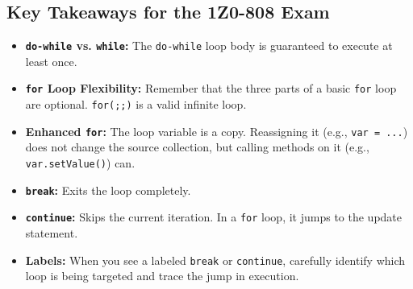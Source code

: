\documentclass[12pt]{article}
\begin{document}
\begin{enumerate}[label=(\arabic*)]
\section*{Key Takeaways for the 1Z0-808 Exam}
\begin{itemize}
    \item \textbf{\texttt{do-while} vs. \texttt{while}:} The \texttt{do-while} loop body is guaranteed to execute at least once.
    \item \textbf{\texttt{for} Loop Flexibility:} Remember that the three parts of a basic \texttt{for} loop are optional. \texttt{for(;;)} is a valid infinite loop.
    \item \textbf{Enhanced \texttt{for}:} The loop variable is a copy. Reassigning it (e.g., \texttt{var = ...}) does not change the source collection, but calling methods on it (e.g., \texttt{var.setValue()}) can.
    \item \textbf{\texttt{break}:} Exits the loop completely.
    \item \textbf{\texttt{continue}:} Skips the current iteration. In a \texttt{for} loop, it jumps to the update statement.
    \item \textbf{Labels:} When you see a labeled \texttt{break} or \texttt{continue}, carefully identify which loop is being targeted and trace the jump in execution.
\end{itemize}
\end{enumerate}
\end{document}
